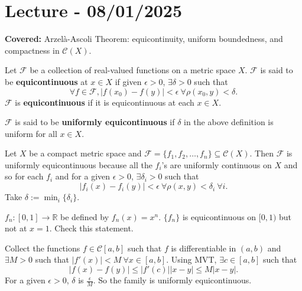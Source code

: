 \documentclass{functionspaces}
\begin{document}
\endgroup


\newpage
\section{Lecture - 08/01/2025}

\textbf{Covered:} Arzelà-Ascoli Theorem: equicontinuity, uniform boundedness, and compactness in $\mathcal{C}(X)$.

\begingroup
\setlength{\parskip}{6pt}
\setlength{\parindent}{0pt}

\begin{definition}[Equicontinuity]
Let $\mathcal{F}$ be a collection of real-valued functions on a metric space $X$. $\mathcal{F}$ is said to be \textbf{equicontinuous} at $x \in X$ if given $\epsilon > 0$, $\exists \delta > 0$ such that
\[
\forall f \in \mathcal{F}, |f(x_0) - f(y)| < \epsilon \ \forall \rho(x_0, y) < \delta.
\]
$\mathcal{F}$ is \textbf{equicontinuous} if it is equicontinuous at each $x \in X$.
\end{definition}

\begin{definition}
$\mathcal{F}$ is said to be \textbf{uniformly equicontinuous} if $\delta$ in the above definition is uniform for all $x \in X$.
\end{definition}

\begin{example}
Let $X$ be a compact metric space and $\mathcal{F} = \{f_1, f_2, \ldots, f_n\} \subseteq \mathcal{C}(X)$. Then $\mathcal{F}$ is uniformly equicontinuous because all the $f_i$'s are uniformly continuous on $X$ and so for each $f_i$ and for a given $\epsilon > 0$, $\exists \delta_i > 0$ such that
\[
|f_i(x) - f_i(y)| < \epsilon \ \forall \rho(x,y) < \delta_i \ \forall i.
\]
Take $\delta := \min_i\{\delta_i\}$.
\end{example}

\begin{example}
$f_n : [0,1] \to \mathbb{R}$ be defined by $f_n(x) = x^n$. $\{f_n\}$ is equicontinuous on $[0,1)$ but not at $x=1$. Check this statement.
\end{example}

\begin{example}
Collect the functions $f \in \mathcal{C}[a,b]$ such that $f$ is differentiable in $(a,b)$ and $\exists M > 0$ such that $|f'(x)| < M \ \forall x \in [a,b]$. Using MVT, $\exists c \in [a,b]$ such that
\[
|f(x) - f(y)| \leq |f'(c)||x - y| \leq M |x - y|.
\]
For a given $\epsilon > 0$, $\delta$ is $\frac{\epsilon}{M}$. So the family is uniformly equicontinuous.
\end{example}
\end{document}
